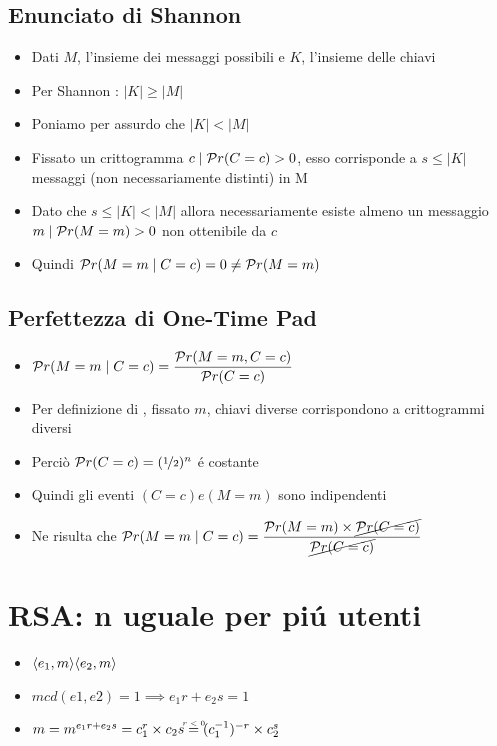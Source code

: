 \subsection{Enunciato di Shannon}

\begin{itemize}
    \item Dati $M$, l'insieme dei messaggi possibili e $K$, l'insieme delle chiavi
    \item Per Shannon : $|K| \geq |M|$
    \item Poniamo per assurdo che $|K| < |M|$
    \item Fissato un crittogramma $c \mid \mathcal{P}r(C = c) > 0$, esso corrisponde a $s \leq |K|$ messaggi (non necessariamente distinti) in M
    \item Dato che $s \leq |K| < |M|$ allora necessariamente esiste almeno un messaggio $m \mid \mathcal{P}r(M=m)>0$ non ottenibile da $c$
    \item Quindi $\mathcal{P}r(M=m \mid C=c) = 0 \not= \mathcal{P}r(M=m)$
\end{itemize}

\subsection{Perfettezza di One-Time Pad}

\begin{itemize}
    \item $\mathcal{P}r(M=m \mid C=c) = \dfrac{\mathcal{P}r(M=m,C=c)}{\mathcal{P}r(C=c)}$
    \item Per definizione di , fissato $m$, chiavi diverse corrispondono a crittogrammi diversi
    \item Perci\`o $\mathcal{P}r(C = c) = (\nicefrac{1}{2})^n$ \'e costante
    \item Quindi gli eventi $(C=c) e (M=m)$ sono indipendenti
    \item Ne risulta che $\mathcal{P}r(M=m \mid C=c) = \dfrac{\mathcal{P}r(M=m) \times \cancel{\mathcal{P}r(C=c)}}{\cancel{\mathcal{P}r(C=c)}}$
\end{itemize}

\section{RSA: n uguale per pi\'u utenti}

\begin{itemize}
    \item ${\langle e_1, m \rangle} {\langle e_2, m \rangle}$
    \item $mcd(e1, e2) = 1 \implies e_1r + e_2s = 1$
    \item $m = m^{e_1r + e_2s} = c_1^r \times c_2s \de{$r < 0$} (c_1^{-1})^{-r} \times c_2^s$
\end{itemize}

